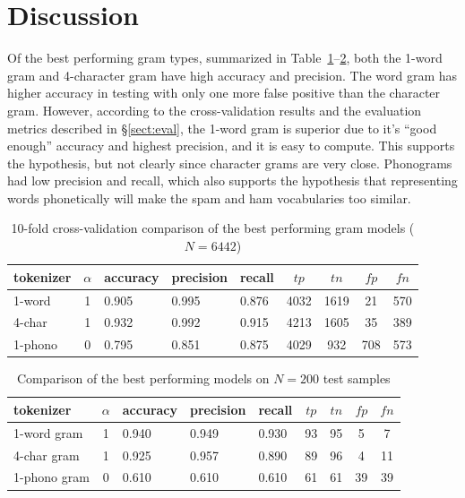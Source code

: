 \documentclass[10pt]{article}
\def \corpusSize {6442}
\def \testSize {200}
\begin{document}
\section{Discussion}

Of the best performing gram types, summarized in
Table~\ref{table:cv-sum}--\ref{table:t-sum}, both the 1-word gram and
4-character gram have high accuracy and precision. The word gram has higher
accuracy in testing with only one more false positive than the character gram.
However, according to the cross-validation results and the evaluation metrics
described in \S\ref{sect:eval}, the 1-word gram is superior due to it's ``good
enough'' accuracy and highest precision, and it is easy to compute. This
supports the hypothesis, but not clearly since character grams are very close.
Phonograms had low precision and recall, which also supports the hypothesis
that representing words phonetically will make the spam and ham vocabularies
too similar.

\begin{table}[b]
  \centering
  \caption{10-fold cross-validation comparison of the best performing gram
    models ($N=\corpusSize$)}
  \label{table:cv-sum}
  \begin{tabular}{lclllcccc}
    \toprule
    tokenizer & $\alpha$ & accuracy & precision & recall & $tp$ & $tn$ & $fp$ & $fn$ \\ \midrule
    1-word & 1 & 0.905 & 0.995 & 0.876 & 4032 & 1619 & 21 & 570 \\
    4-char & 1 & 0.932 & 0.992 & 0.915 & 4213 & 1605 & 35 & 389 \\
    1-phono& 0 & 0.795 & 0.851 & 0.875 & 4029 & 932 & 708 & 573 \\
  \end{tabular}
\end{table}

\begin{table}[h!]
  \centering
  \caption{Comparison of the best performing models on $N=\testSize$ test samples}
  \label{table:t-sum}
  \begin{tabular}{lclllcccc}
    \toprule
    tokenizer & $\alpha$ & accuracy & precision & recall & $tp$ & $tn$ & $fp$ & $fn$ \\ \midrule
    1-word gram & 1 & 0.940 & 0.949 & 0.930 & 93 & 95 & 5 & 7 \\
    4-char gram & 1 & 0.925 & 0.957 & 0.890 & 89 & 96 & 4 & 11 \\
    1-phono gram & 0 & 0.610 & 0.610 & 0.610 & 61 & 61 & 39 & 39 \\
  \end{tabular}
\end{table}
\end{document}
